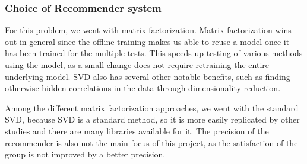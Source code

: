\subsubsection{Choice of Recommender system}\label{sec:decision} %
For this problem, we went with matrix factorization. Matrix factorization wins out in general since the offline training makes us able to reuse a model once it has been trained for the multiple tests. This speeds up testing of various methods using the model, as a small change does not require retraining the entire underlying model. SVD also has several other notable benefits, such as finding otherwise hidden correlations in the data through dimensionality reduction.

Among the different matrix factorization approaches, we went with the standard SVD, because SVD is a standard method, so it is more easily replicated by other studies and there are many libraries available for it. The precision of the recommender is also not the main focus of this project, as the satisfaction of the group is not improved by a better precision.